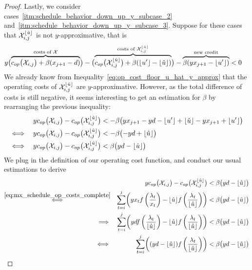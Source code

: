 \begin{proof}
Lastly, we consider cases~\ref{itm:schedule_behavior_down_up_y_subcase_2} and~\ref{itm:schedule_behavior_down_up_y_subcase_3}. Suppose for these cases that $\mathcal{X}_{i,j}^{\lfloor\hat{u}\rfloor}$ is not $y$-approxi\-mative, that is
\begin{align*}
	y\bigl(\overbrace{c_{op}\bigl(\mathcal{X}_{i,j}\bigr)+\beta(x_{j+1}-d)}^{\text{costs of }\mathcal{X}}\bigr)&-\bigl(\overbrace{c_{op}\bigl(\mathcal{X}_{i,j}^{\lfloor\hat{u}\rfloor}\bigr)+\beta(\lfloor u'\rfloor-\lfloor\hat{u}\rfloor)}^{\text{costs of }\mathcal{X}_{i,j}^{\lfloor\hat{u}\rfloor}}\bigr)-\overbrace{\beta(yx_{j+1}-\lfloor u'\rfloor)}^{\text{new credit}}<0
\end{align*}
We already know from Inequality~\eqref{eq:op_cost_floor_u_hat_y_approx} that the operating costs of $\mathcal{X}_{i,j}^{\lfloor\hat{u}\rfloor}$ are $y$-approximative. However, as the total difference of costs is still negative, it seems interesting to get an estimation for $\beta$ by rearranging the previous inequality:
\begin{align*}
	&&yc_{op}\bigl(\mathcal{X}_{i,j}\bigr)-c_{op}\bigl(\mathcal{X}_{i,j}^{\lfloor\hat{u}\rfloor}\bigr)&<-\beta\bigl(yx_{j+1}-yd-\lfloor u'\rfloor+\lfloor\hat{u}\rfloor-yx_{j+1}+\lfloor u'\rfloor\bigr)\\
	\iff&&yc_{op}\bigl(\mathcal{X}_{i,j}\bigr)-c_{op}\bigl(\mathcal{X}_{i,j}^{\lfloor\hat{u}\rfloor}\bigr)&<-\beta\bigl(-yd+\lfloor\hat{u}\rfloor\bigr)\\
	\iff&&yc_{op}\bigl(\mathcal{X}_{i,j}\bigr)-c_{op}\bigl(\mathcal{X}_{i,j}^{\lfloor\hat{u}\rfloor}\bigr)&<\beta\bigl(yd-\lfloor\hat{u}\rfloor\bigr)
\end{align*}
We plug in the definition of our operating cost function, and conduct our usual estimations to derive
\begin{align}
	&&y\opcosts\bigl(\mx_{i,j}\bigr)-\opcosts\bigl(\mx_{i,j}^{\floor{\hat{u}}}\bigr)&<\beta\bigl(yd-\floor{\hat{u}}\bigr)\nonumber\\
	\stackrel{\eqref{eq:mx_schedule_op_costs_complete}}{\iff}&&\sum\limits_{t=i}^{j}\biggl(yx_tf\left(\frac{\lambda_t}{x_t}\right)-\floor{\hat{u}}f\left(\frac{\lambda_t}{\floor{\hat{u}}}\right)\biggr)&<\beta\bigl(yd-\floor{\hat{u}}\bigr)\nonumber\\
	\implies&&\sum\limits_{t=i}^{j}\biggl(ydf\left(\frac{\lambda_t}{\floor{\hat{u}}}\right)-\floor{\hat{u}}f\left(\frac{\lambda_t}{\floor{\hat{u}}}\right)\biggr)&<\beta\bigl(yd-\floor{\hat{u}}\bigr)\nonumber\\
	\iff&&\sum\limits_{t=i}^{j}\biggl((yd-\floor{\hat{u}})f\left(\frac{\lambda_t}{\floor{\hat{u}}}\right)\biggr)&<\beta\bigl(yd-\floor{\hat{u}}\bigr)\nonumber\\

\end{align}
\end{proof}
